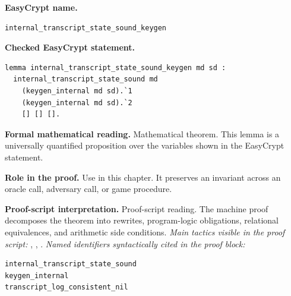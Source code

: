 \begin{formaltheorem}
\noindent\textbf{EasyCrypt name.}
\begin{lstlisting}[language=EasyCrypt,basicstyle=\ttfamily\scriptsize]
internal_transcript_state_sound_keygen
\end{lstlisting}
\noindent\textbf{Checked EasyCrypt statement.}
\begin{lstlisting}[language=EasyCrypt,basicstyle=\ttfamily\scriptsize]
lemma internal_transcript_state_sound_keygen md sd :
  internal_transcript_state_sound md
    (keygen_internal md sd).`1
    (keygen_internal md sd).`2
    [] [] [].
\end{lstlisting}
\noindent\textbf{Formal mathematical reading.}
Mathematical theorem. This lemma is a universally quantified proposition over the variables shown in the EasyCrypt statement.

\noindent\textbf{Role in the proof.}
Use in this chapter. It preserves an invariant across an oracle call, adversary call, or game procedure.

\noindent\textbf{Proof-script interpretation.}
Proof-script reading. The machine proof decomposes the theorem into rewrites, program-logic obligations, relational equivalences, and arithmetic side conditions.
\emph{Main tactics visible in the proof script:} , , .
\emph{Named identifiers syntactically cited in the proof block:}
\begin{lstlisting}[language=EasyCrypt,basicstyle=\ttfamily\scriptsize]
internal_transcript_state_sound
keygen_internal
transcript_log_consistent_nil
\end{lstlisting}

\end{formaltheorem}

